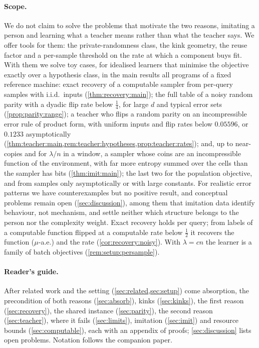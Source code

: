 \paragraph{Scope.} We do not claim to solve the problems that motivate the two reasons, imitating a person and learning what a teacher means rather than what the teacher says. We offer tools for them: the private-randomness class, the kink geometry, the reuse factor and a per-sample threshold on the rate at which a component buys fit. With them we solve toy cases, for idealised learners that minimise the objective exactly over a hypothesis class, in the main results all programs of a fixed reference machine: exact recovery of a computable sampler from per-query samples with i.i.d.\ inputs (\cref{thm:recovery:main}); the full table of a noisy random parity with a dyadic flip rate below $\frac14$, for large $d$ and typical error sets (\cref{prop:parity:range}); a teacher who flips a random parity on an incompressible error rule of product form, with uniform inputs and flip rates below $0.05596$, or $0.1233$ asymptotically (\cref{thm:teacher:main,rem:teacher:hypotheses,prop:teacher:rates}); and, up to near-copies and for $\lambda/n$ in a window, a sampler whose coins are an incompressible function of the environment, with far more entropy summed over the cells than the sampler has bits (\cref{thm:imit:main}); the last two for the population objective, and from samples only asymptotically or with large constants. For realistic error patterns we have counterexamples but no positive result, and conceptual problems remain open (\cref{sec:discussion}), among them that imitation data identify behaviour, not mechanism, and settle neither which structure belongs to the person nor the complexity weight. Exact recovery holds per query; from labels of a computable function flipped at a computable rate below $\frac12$ it recovers the function ($\mu$-a.e.) and the rate (\cref{cor:recovery:noisy}). With $\lambda=cn$ the learner is a family of batch objectives (\cref{rem:setup:persample}).

\paragraph{Reader's guide.} After related work and the setting (\cref{sec:related,sec:setup}) come absorption, the precondition of both reasons (\cref{sec:absorb}), kinks (\cref{sec:kinks}), the first reason (\cref{sec:recovery}), the shared instance (\cref{sec:parity}), the second reason (\cref{sec:teacher}), where it fails (\cref{sec:limits}), imitation (\cref{sec:imit}) and resource bounds (\cref{sec:computable}), each with an appendix of proofs; \cref{sec:discussion} lists open problems. Notation follows the companion paper.
